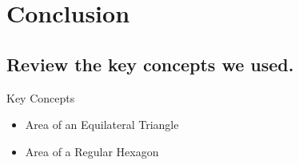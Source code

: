 \documentclass{beamer} %
\begin{document}
\begin{comment}
    \begin{tikzpicture}[scale=0.5]
      \draw (0,0) -- (0,4.46971821313);
      \draw (0,0) -- (14.3185760149,0);
      \draw (0,4.46971821313) -- (14.3185760149,0) node [midway,above] {$15$};
      \coordinate (A) at (0,4.46971821313);
      \coordinate (B) at (0,0);
      \coordinate (C) at (14.3185760149,0);
      \tkzMarkRightAngle(A,B,C)
    \end{tikzpicture}
\end{comment}

\setcounter{equation}{0}

\section{Conclusion}

\subsection*{Review the key concepts we used.}

\begin{frame}{Key Concepts}
  \pause
  \begin{itemize}
  \item Area of an Equilateral Triangle
  \pause
  \item Area of a Regular Hexagon
  \end{itemize}
\end{frame}
\end{document}

